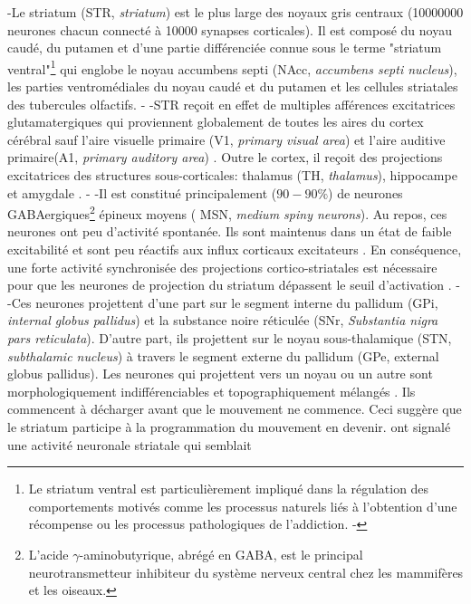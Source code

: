 -Le striatum (STR, \textit{striatum}) est le plus large des noyaux gris centraux (10000000 neurones chacun connecté à 10000 synapses corticales). Il est composé du noyau caudé, du putamen et d'une partie différenciée connue sous le terme "striatum ventral"\footnote{Le striatum ventral est particulièrement impliqué dans la régulation des comportements motivés comme les processus naturels liés à l’obtention d’une récompense ou les processus pathologiques de l’addiction. %
-} qui englobe le noyau accumbens septi (NAcc, \textit{accumbens septi nucleus}), les parties ventromédiales du noyau caudé et du putamen et les cellules striatales des tubercules olfactifs.
-
-STR reçoit en effet de multiples afférences excitatrices glutamatergiques qui proviennent globalement de toutes les aires du cortex cérébral sauf l'aire visuelle primaire (V1, \textit{primary visual area}) et l'aire auditive primaire(A1, \textit{primary auditory area}) \citep{Albin:1995, Gerfen:1990, Cherubini:1988, Kemp:1970}. Outre le cortex, il reçoit des projections excitatrices des structures sous-corticales: thalamus (TH, \textit{thalamus}), hippocampe et amygdale \citep{Lapper:1992, Sadikot:1992}. 
-
-Il est constitué principalement ($90-90\%$) de neurones GABAergiques\footnote{L'acide $\gamma$-aminobutyrique, abrégé en GABA, est le principal neurotransmetteur inhibiteur du système nerveux central chez les mammifères et les oiseaux.} épineux moyens ( MSN, \textit{medium spiny neurons}). Au repos, ces neurones ont peu d'activité spontanée. Ils sont maintenus dans un état de faible excitabilité et sont peu réactifs aux influx corticaux excitateurs \citep{Nisenbaum:1995}. En conséquence, une forte activité synchronisée des projections cortico-striatales est nécessaire pour que les neurones de projection du striatum dépassent le seuil d'activation \citep {Mahon:2001, Mahon:2003}.
-
-Ces neurones projettent d'une part sur le segment interne du pallidum (GPi, \textit{internal globus pallidus}) et la substance noire réticulée (SNr, \textit { Substantia nigra pars reticulata}). D'autre part, ils projettent sur le noyau sous-thalamique (STN, \textit{subthalamic nucleus}) à travers le segment externe du pallidum (GPe, \textit{} external globus pallidus). Les neurones qui projettent vers un noyau ou un autre sont morphologiquement indifférenciables et topographiquement mélangés \citep{Feger:1984, Gerfen:1988, Parent:1989}. Ils commencent à décharger avant que le mouvement ne commence. Ceci suggère que le striatum participe à la programmation du mouvement en devenir. \citep{Lidsky:1985} ont signalé une activité neuronale striatale qui semblait
